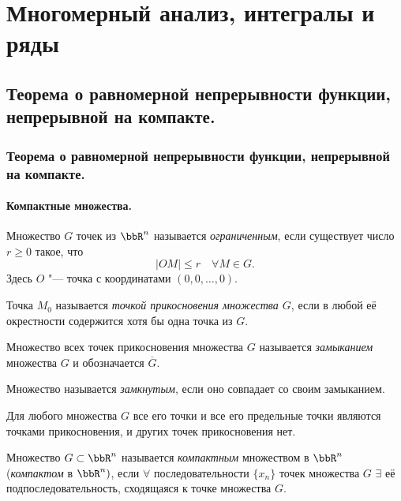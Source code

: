 \part{Многомерный анализ, интегралы и ряды}

\chapter{Теорема о равномерной непрерывности функции, непрерывной на компакте.}

\section{Теорема о равномерной непрерывности функции, непрерывной на компакте.}

\subsection{Компактные множества.}

\begin{defn}
Множество $G$ точек из $\bbR ^n$ называется \textit{ограниченным}, если существует число $r\ge 0$ такое, что
$$
|OM|\le r \quad \forall M\in G.
$$
Здесь $O$ "--- точка с координатами $(0,0,\dots,0)$.
\end{defn}

\begin{defn}
Точка $M_0$ называется \textit{точкой прикосновения множества $G$}, если в любой её окрестности содержится хотя бы одна точка из $G$.
\end{defn}

\begin{defn}
Множество всех точек прикосновения множества $G$ называется \textit{замыканием} множества $G$ и обозначается $\overline{G}$.
\end{defn}

\begin{defn}
Множество называется \textit{замкнутым}, если оно совпадает со своим замыканием.
\end{defn}

Для любого множества $G$ все его точки и все его предельные точки являются точками прикосновения, и других точек прикосновения нет.

\begin{defn}
Множество $G \subset \bbR^n$ называется \textit{компактным} множеством в $\bbR^n$ (\textit{компактом} в $\bbR^n)$, если $\forall$ последовательности $\{ x_n \}$ точек множества $G$ $\exists$ её подпоследовательность, сходящаяся к точке множества $G$.
\end{defn}

